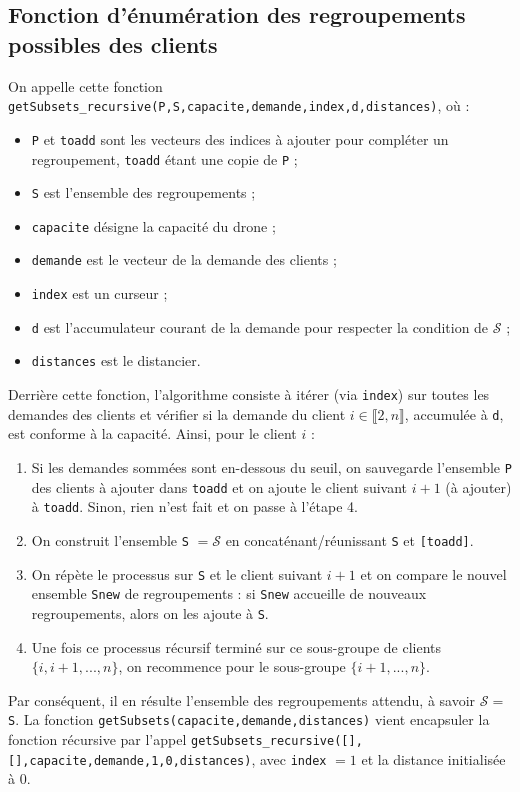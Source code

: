 \documentclass[french, 11pt, a4paper]{article} %
\newcommand{\Sc}{\mathcal{S}} %
\newcommand{\smb}{\smallbreak}
\begin{document}
\subsection{Fonction d'énumération des regroupements possibles des clients}
On appelle cette fonction \texttt{getSubsets\_recursive(P,S,capacite,demande,index,d,distances)},
où : \begin{itemize}
    \item \verb+P+ et \verb+toadd+ sont les vecteurs des indices à ajouter pour compléter un regroupement, \verb+toadd+ étant une copie de \verb+P+ ;
    \item \verb+S+ est l'ensemble des regroupements ;
    \item \verb+capacite+ désigne la capacité du drone ;
    \item \verb+demande+ est le vecteur de la demande des clients ;
    \item \verb+index+ est un curseur ;
    \item \verb+d+ est l'accumulateur courant de la demande pour respecter la condition de $\Sc$ ;
    \item \verb+distances+ est le distancier.
\end{itemize}

Derrière cette fonction, l'algorithme consiste à itérer (via \verb+index+) sur toutes les demandes des clients
et vérifier si la demande du client $i \in \llbracket 2,n \rrbracket$, accumulée à \verb+d+, est conforme à la capacité. Ainsi,
pour le client $i$ : 
\begin{enumerate}
    \item Si les demandes sommées sont en-dessous du seuil, on sauvegarde l'ensemble \verb+P+ des clients à ajouter dans \verb+toadd+
    et on ajoute le client suivant $i+1$ (à ajouter) à \verb+toadd+. Sinon, rien n'est fait et on passe à l'étape 4.
    \item On construit l'ensemble \verb+S+ $= \Sc$ en concaténant/réunissant \verb+S+ et \verb+[toadd]+.
    \item On répète le processus sur \verb+S+ et le client suivant $i+1$ et on compare le nouvel ensemble \verb+Snew+
    de regroupements : si \verb+Snew+ accueille de nouveaux regroupements, alors on les ajoute à \verb+S+.
    \item Une fois ce processus récursif terminé sur ce sous-groupe de clients $\{i,i+1,...,n\}$, on recommence pour le sous-groupe
$\{i+1,...,n\}$.
\end{enumerate}
\smb Par conséquent, il en résulte l'ensemble des regroupements attendu, à savoir $\Sc = $ \verb+S+.
\smb La fonction \texttt{getSubsets(capacite,demande,distances)} vient encapsuler la fonction récursive par l'appel
\texttt{getSubsets\_recursive([],[],capacite,demande,1,0,distances)}, avec \verb+index+ $=1$ et la distance initialisée à $0$.
\end{document}
